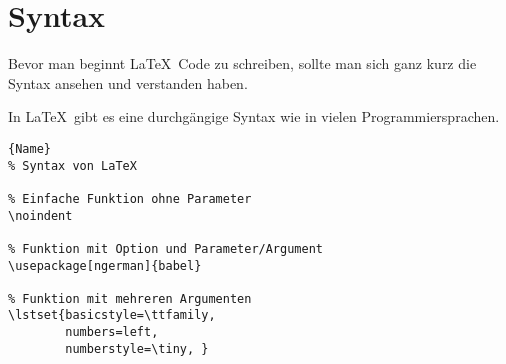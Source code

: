 \section{Syntax}

\noindent
Bevor man beginnt \LaTeX~Code zu schreiben, sollte man sich
ganz kurz die Syntax ansehen und verstanden haben.

In \LaTeX~gibt es eine durchgängige Syntax wie in vielen
Programmiersprachen.

\begin{lstlisting}[caption=Einfache Aufzählung]{Name}
% Syntax von LaTeX

% Einfache Funktion ohne Parameter
\noindent

% Funktion mit Option und Parameter/Argument
\usepackage[ngerman]{babel}

% Funktion mit mehreren Argumenten 
\lstset{basicstyle=\ttfamily,
        numbers=left,
        numberstyle=\tiny, }
\end{lstlisting}

